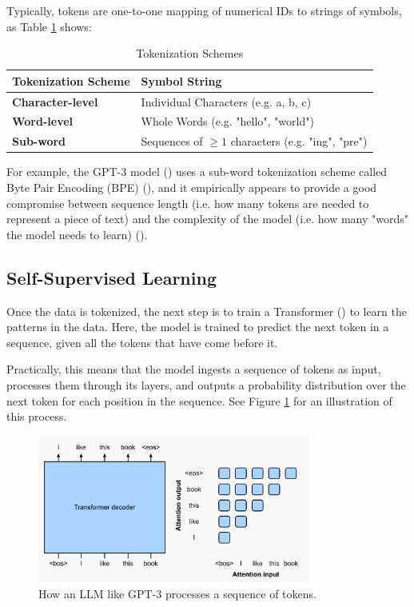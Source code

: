 \documentclass{article} %
\begin{document}
Typically, tokens are one-to-one mapping of numerical IDs to strings of symbols, as Table \ref{tab:tok_schemes} shows:
\begin{table}[h!]
\centering
\begin{tabular}{p{}p{}}
\toprule
\textbf{Tokenization Scheme} & \textbf{Symbol String} \\
\midrule
\textbf{Character-level} & Individual Characters (e.g. a, b, c) \\
\addlinespace
\textbf{Word-level} & Whole Words (e.g. "hello", "world") \\
\addlinespace
\textbf{Sub-word} & Sequences of $\geq 1$ characters (e.g. "ing", "pre") \\
\bottomrule
\end{tabular}
\caption{Tokenization Schemes}
\label{tab:tok_schemes}
\end{table}

For example, the GPT-3 model (\cite{Brown-et-al-2020}) uses a sub-word tokenization scheme 
called Byte Pair Encoding (BPE) (\cite{Sennrich-et-al-2016}), and it empirically appears to provide
a good compromise between sequence length (i.e. how many tokens are needed to represent a piece of text)
and the complexity of the model (i.e. how many "words" the model needs to learn) (\cite{Brown-et-al-2020}).

\subsection{Self-Supervised Learning}
Once the data is tokenized, the next step is to train a Transformer (\cite{Vaswani-et-al-2017}) to learn the patterns in the data.
Here, the model is trained to predict the next token in a sequence, given all the tokens that have come before it.

Practically, this means that the model ingests a sequence of tokens as input, 
processes them through its layers, and outputs a probability distribution over the next token
for each position in the sequence. See Figure \ref{fig:gpt-decoder-only} for an illustration of this process.

\begin{figure}[h]
    \centering
    \includegraphics[width=0.8\textwidth]{images/gpt-decoder-only.png}
    \caption{How an LLM like GPT-3 processes a sequence of tokens.}
    \label{fig:gpt-decoder-only}
\end{figure}
\end{document}
